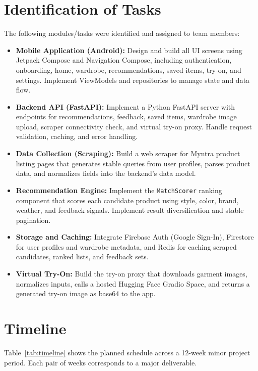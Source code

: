 \documentclass[12pt,a4paper]{report}
\begin{document}
\section{Identification of Tasks}

The following modules/tasks were identified and assigned to team members:

\begin{itemize}
  \item \textbf{Mobile Application (Android):} Design and build all UI screens using Jetpack Compose and Navigation Compose, including authentication, onboarding, home, wardrobe, recommendations, saved items, try-on, and settings. Implement ViewModels and repositories to manage state and data flow.
  \item \textbf{Backend API (FastAPI):} Implement a Python FastAPI server with endpoints for recommendations, feedback, saved items, wardrobe image upload, scraper connectivity check, and virtual try-on proxy. Handle request validation, caching, and error handling.
  \item \textbf{Data Collection (Scraping):} Build a web scraper for Myntra product listing pages that generates stable queries from user profiles, parses product data, and normalizes fields into the backend's data model.
  \item \textbf{Recommendation Engine:} Implement the \texttt{MatchScorer} ranking component that scores each candidate product using style, color, brand, weather, and feedback signals. Implement result diversification and stable pagination.
  \item \textbf{Storage and Caching:} Integrate Firebase Auth (Google Sign-In), Firestore for user profiles and wardrobe metadata, and Redis for caching scraped candidates, ranked lists, and feedback sets.
  \item \textbf{Virtual Try-On:} Build the try-on proxy that downloads garment images, normalizes inputs, calls a hosted Hugging Face Gradio Space, and returns a generated try-on image as base64 to the app.
\end{itemize}

\section{Timeline}

Table~\ref{tab:timeline} shows the planned schedule across a 12-week minor project period. Each pair of weeks corresponds to a major deliverable.
\end{document}
